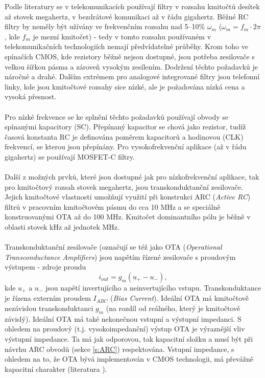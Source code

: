 Podle literatury \cite{19} se v telekomunikacích používají filtry v rozsahu kmitočtů desítek až stovek megahertz, v bezdrátové komunikaci až v řádu gigahertz. Běžné RC filtry by neměly být užívány ve frekvenčním rozsahu nad 5--10$\%$ $\omega _m$ ($\omega _m = f_m \cdot 2 \pi$, kde $f_m$ je mezní kmitočet) - tedy v tomto rozsahu používaném v telekomunikačních technologiích nemají předvídatelné průběhy. Krom toho ve spínačích CMOS, kde rezistory běžně nejsou dostupné, jsou potřeba zesilovače s velkou šířkou pásma a zároveň vysokým zesílením. Dodržení těchto požadavků je náročné a drahé. Dalším extrémem pro analogové integrované filtry jsou telefonní linky, kde jsou kmitočtové rozsahy sice nízké, ale je požadována nízká cena a vysoká přesnost.\\
\\
Pro nízké frekvence se ke splnění těchto požadavků používají obvody se spínanými kapacitory (SC). Přepínaný kapacitor se chová jako rezistor, tudíž časová konstanta RC je definována poměrem kapacitorů a hodinovou (CLK) frekvencí, se kterou jsou přepínány. Pro vysokofrekvenční aplikace (až v řádu gigahertz) se používají MOSFET-C filtry.\\
\\
Další z možných prvků, které jsou dostupné jak pro nízkofrekvenční aplikace, tak pro kmitočtový rozsah stovek megahertz, jsou transkonduktanční zesilovače. Jejich kmitočtové vlastnosti umožňují využití při konstrukci ARC (\textit{Active RC}) filtrů v pracovním kmitočtovém pásmu do cca 10 MHz a se speciálně konstruovanými OTA až do 100 MHz. Kmitočet dominantního pólu je běžně v oblasti stovek kHz až jednotek MHz.\\
\\
Transkonduktanční zesilovače (označují se též jako OTA (\textit{Operational Transconductance Amplifiers}) jsou napětím řízené zesilovače s proudovým výstupem - zdroje proudu
\begin{equation}
i_{out} = g_m(u_+ - u_-),
\end{equation}
kde $u_+$ a $u_-$ jsou napětí invertujícího a neinvertujícího vstupu.  Transkonduktance je řízena externím proudem $I_{ABC}$ (\textit{Bias Current}). Ideální OTA má kmitočtově nezávislou transkonduktanci $g_m$ (na rozdíl od reálného, který je kmitočtově závislý). Ideální OTA má také nekonečnou vstupní a výstupní impedanci. S ohledem na proudový (t.j. vysokoimpedanční) výstup OTA je výraznější vliv výstupní impedance. Ta má jak odporovou, tak kapacitní složku a musí být při návrhu ARC obvodů (sekce \ref{s:ARC}) respektována. Vstupní impedance, s ohledem na to, že OTA bývá implementován v CMOS technologii, má převážně kapacitní charakter (literatura \cite{10}).
